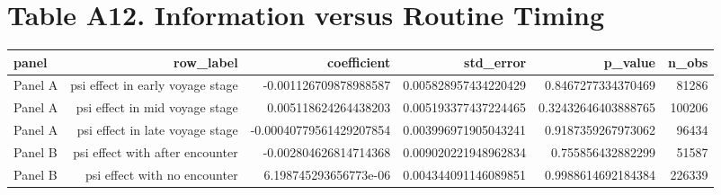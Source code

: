 \documentclass{article}
\begin{document}
\section*{Table A12. Information versus Routine Timing}
\begin{tabular}{lrrrrr}
\hline
panel & row_label & coefficient & std_error & p_value & n_obs \\
\hline
Panel A & psi effect in early voyage stage & -0.001126709878988587 & 0.005828957434220429 & 0.8467277334370469 & 81286 \\
Panel A & psi effect in mid voyage stage & 0.005118624264438203 & 0.005193377437224465 & 0.32432646403888765 & 100206 \\
Panel A & psi effect in late voyage stage & -0.00040779561429207854 & 0.003996971905043241 & 0.9187359267973062 & 96434 \\
Panel B & psi effect with after encounter & -0.002804626814714368 & 0.009020221948962834 & 0.755856432882299 & 51587 \\
Panel B & psi effect with no encounter & 6.198745293656773e-06 & 0.004344091146089851 & 0.9988614692184384 & 226339 \\
\hline
\end{tabular}
\end{document}
